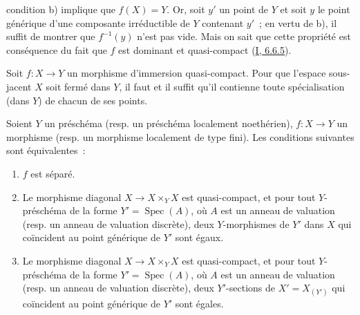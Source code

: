 condition b) implique que $f(X)=Y$. Or, soit $y'$ un point de $Y$ et soit $y$
le point générique d'une composante irréductible de $Y$ contenant $y'$~; en
vertu de b), il suffit de montrer que $f^{-1}(y)$ n'est pas vide. Mais on sait
que cette propriété est conséquence du fait que $f$ est dominant et
quasi-compact (\hyperref[I.6.6.5-fr]{I, 6.6.5}).

\begin{corollary}[7.2.2]
\label{II.7.2.2-fr}
Soit $f:X\to Y$ un morphisme d'immersion quasi-compact. Pour que l'espace
sous-jacent $X$ soit fermé dans $Y$, il faut et il suffit qu'il contienne toute
spécialisation (dans $Y$) de chacun de ses points.
\end{corollary}

\begin{proposition}[7.2.3]
\label{II.7.2.3-fr}
Soient $Y$ un préschéma (resp. un préschéma localement noethérien), $f:X\to Y$
un morphisme (resp. un morphisme localement de type fini). Les conditions
suivantes sont équivalentes~:
\begin{enumerate}
\item[\rm a)] $f$ est séparé.
\item[\rm b)] Le morphisme diagonal $X\to X\times_YX$ est quasi-compact, et
pour tout $Y$-préschéma de la forme $Y'=\operatorname{Spec}(A)$, où $A$ est un
anneau de valuation (resp. un anneau de valuation discrète), deux
$Y$-morphismes de $Y'$ dans $X$ qui coïncident au point générique de $Y'$ sont
égaux.
\item[\rm c)] Le morphisme diagonal $X\to X\times_YX$ est quasi-compact, et
pour tout $Y$-préschéma de la forme $Y'=\operatorname{Spec}(A)$, où $A$ est un
anneau de valuation (resp. un anneau de valuation discrète), deux
$Y'$-sections de $X'=X_{(Y')}$ qui coïncident au point générique de $Y'$ sont
égales.
\end{enumerate}
\end{proposition}


